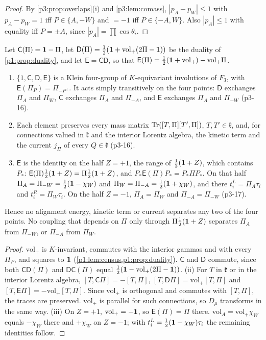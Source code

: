 \begin{proof}
By \cref{p3:prop:overlaps}(i) and \cref{p3:lem:comass}, $|p_A-p_W|\le1$ with $p_A-p_W=1$ iff $P\in\{A,-W\}$ and $=-1$ iff $P\in\{-A,W\}$. Also $|p_A|\le1$ with equality
iff $P=\pm A$, since $|p_A|=\prod\cos\theta_i$.
\end{proof}

\begin{proposition}
\label{p3:prop:klein}
Let $\mathsf C(\Pi)=\mathbf 1-\Pi$, let $\mathsf D(\Pi)=\tfrac12(\mathbf 1+\mathrm{vol}_+(2\Pi-\mathbf 1))$ be the duality of \cref{p1:prop:duality}, and let $\mathsf E=\mathsf C\mathsf D$, so
that $\mathsf E(\Pi)=\tfrac12(\mathbf 1+\mathrm{vol}_+)-\mathrm{vol}_+\Pi$.
\begin{enumerate}[label=(\roman*),leftmargin=2.2em]
\item $\{1,\mathsf C,\mathsf D,\mathsf E\}$ is a Klein four-group of $K$-equivariant involutions of $F_3$, with $\mathsf E(\Pi_P)=\Pi_{-P^\perp}$. It acts simply transitively on
the four points: $\mathsf D$ exchanges $\Pi_A$ and $\Pi_W$, $\mathsf C$ exchanges $\Pi_A$ and $\Pi_{-A}$, and $\mathsf E$ exchanges $\Pi_A$ and $\Pi_{-W}$ (p3-16).
\item Each element preserves every mass matrix $\operatorname{Tr}([T,\Pi][T',\Pi])$, $T,T'\in\mathfrak k$, and, for connections valued in $\mathfrak k$ and the interior Lorentz algebra, the
kinetic term and the current $j_\Pi$ of every $Q\in\mathfrak k$ (p3-16).
\item $\mathsf E$ is the identity on the half $Z=+1$, the range of $\tfrac12(\mathbf 1+Z)$, which contains $P_*$: $\mathsf E(\Pi)\tfrac12(\mathbf 1+Z)=\Pi\tfrac12(\mathbf 1+Z)$, and
$P_*\mathsf E(\Pi)P_*=P_*\Pi P_*$. On that half $\Pi_A=\Pi_{-W}=\tfrac12(\mathbf 1-\chi_W)$ and $\Pi_W=\Pi_{-A}=\tfrac12(\mathbf 1+\chi_W)$, and there $t^L_i=\Pi_A\tau_i$ and
$t^R_i=\Pi_W\tau_i$. On the half $Z=-1$, $\Pi_A=\Pi_W$ and $\Pi_{-A}=\Pi_{-W}$ (p3-17).
\end{enumerate}
Hence no alignment energy, kinetic term or current separates any two of the four points. No coupling that depends on $\Pi$ only through $\Pi\tfrac12(\mathbf 1+Z)$ separates
$\Pi_A$ from $\Pi_{-W}$, or $\Pi_{-A}$ from $\Pi_W$.
\end{proposition}

\begin{proof}
$\mathrm{vol}_+$ is $K$-invariant, commutes with the interior gammas and with every $\Pi_P$, and squares to $\mathbf 1$ (\cref{p1:lem:census,p1:prop:duality}). $\mathsf C$ and
$\mathsf D$ commute, since both $\mathsf C\mathsf D(\Pi)$ and $\mathsf D\mathsf C(\Pi)$ equal $\tfrac12(\mathbf 1-\mathrm{vol}_+(2\Pi-\mathbf 1))$. (ii) For $T$ in $\mathfrak k$ or in the
interior Lorentz algebra, $[T,\mathsf C\Pi]=-[T,\Pi]$, $[T,\mathsf D\Pi]=\mathrm{vol}_+[T,\Pi]$ and $[T,\mathsf E\Pi]=-\mathrm{vol}_+[T,\Pi]$. Since $\mathrm{vol}_+$ is orthogonal and
commutes with $[T,\Pi]$, the traces are preserved. $\mathrm{vol}_+$ is parallel for such connections, so $D_\mu$ transforms in the same way. (iii) On $Z=+1$,
$\mathrm{vol}_+=-\mathbf 1$, so $\mathsf E(\Pi)=\Pi$ there. $\mathrm{vol}_A=\mathrm{vol}_+\chi_W$ equals $-\chi_W$ there and $+\chi_W$ on $Z=-1$; with
$t^L_i=\tfrac12(\mathbf 1-\chi_W)\tau_i$ \cite[Thm.~8.2]{ES17} the remaining identities follow.
\end{proof}


